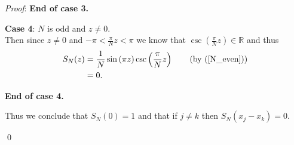 \documentclass[12pt]{article}
\renewenvironment{proof}{\hspace{-4 ex} \emph{Proof}:}{\qed}
\newcommand{\RR}{\mathbb{R}}
\begin{document}
\begin{proof}
	\textbf{End of case 3.}
	\bigbreak
	
	\textbf{Case 4}: $N$ is odd and $z\neq 0$. \\
	Then since $z \neq 0$ and $-\pi < \frac{\pi}{N}z < \pi$ we know that $\csc(\tfrac{\pi}{N}z) \in \RR$ and thus
	\begin{align*}
		S_N(z) &= \frac{1}{N} \sin \left(\pi z \right) \csc \left( \frac{\pi}{N}z \right) \tag{\text{by (\ref{N_even})}}\\
		&= 0 \text{.}
	\end{align*}	
	
	\textbf{End of case 4.}
	\bigbreak
	
	Thus we conclude that $S_N(0)=1$ and that if $j \neq k$ then $S_N(x_j - x_k) = 0$.
	
\end{proof}
\bigbreak
\end{document}
